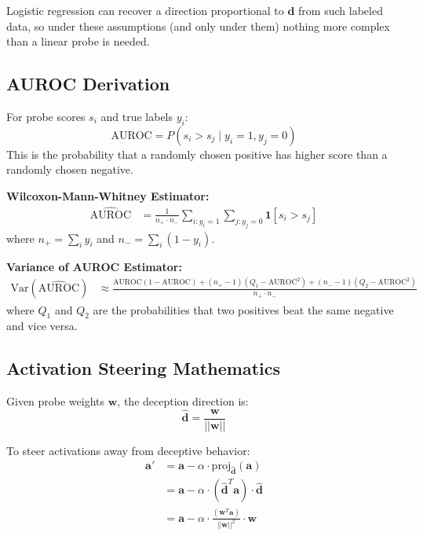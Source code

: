 \documentclass[11pt,letterpaper]{article}
\newcommand{\ind}{\mathbf{1}}
\let\origsubsection\subsection
\renewcommand{\subsection}{\needspace{8\baselineskip}\origsubsection}}
\begin{document}
Logistic regression can recover a direction proportional to $\mathbf{d}$ from such labeled data, so under these assumptions (and only under them) nothing more complex than a linear probe is needed.

\subsection{AUROC Derivation}

\begin{mathbox}
For probe scores $s_i$ and true labels $y_i$:
\[
\text{AUROC} = P(s_i > s_j \mid y_i = 1, y_j = 0)
\]
This is the probability that a randomly chosen positive has higher score than a randomly chosen negative.
\end{mathbox}

\textbf{Wilcoxon-Mann-Whitney Estimator:}
\begin{align}
\widehat{\text{AUROC}} &= \frac{1}{n_+ \cdot n_-} \sum_{i: y_i=1} \sum_{j: y_j=0} \ind[s_i > s_j]
\end{align}
where $n_+ = \sum_i y_i$ and $n_- = \sum_i (1-y_i)$.

\textbf{Variance of AUROC Estimator:}
\begin{align}
\text{Var}(\widehat{\text{AUROC}}) &\approx \frac{\text{AUROC}(1-\text{AUROC}) + (n_+ - 1)(Q_1 - \text{AUROC}^2) + (n_- - 1)(Q_2 - \text{AUROC}^2)}{n_+ \cdot n_-}
\end{align}
where $Q_1$ and $Q_2$ are the probabilities that two positives beat the same negative and vice versa.

\subsection{Activation Steering Mathematics}

\begin{mathbox}
Given probe weights $\mathbf{w}$, the deception direction is:
\[
\hat{\mathbf{d}} = \frac{\mathbf{w}}{||\mathbf{w}||}
\]
\end{mathbox}

To steer activations away from deceptive behavior:
\begin{align}
\mathbf{a}' &= \mathbf{a} - \alpha \cdot \text{proj}_{\hat{\mathbf{d}}}(\mathbf{a}) \\
&= \mathbf{a} - \alpha \cdot (\hat{\mathbf{d}}^T \mathbf{a}) \cdot \hat{\mathbf{d}} \\
&= \mathbf{a} - \alpha \cdot \frac{(\mathbf{w}^T \mathbf{a})}{||\mathbf{w}||^2} \cdot \mathbf{w}
\end{align}
\end{document}

